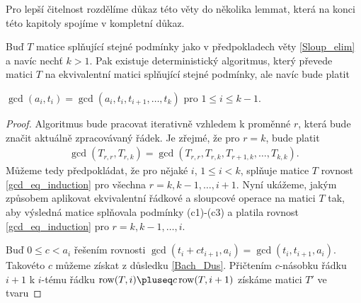 Pro lepší čitelnost rozdělíme důkaz této věty do několika lemmat, která na konci
této kapitoly spojíme v kompletní důkaz.

\begin{lem} \label{Sloup_elim_GCD}
Buď $ T $ matice splňující stejné podmínky jako v předpokladech věty
\ref{Sloup_elim} a navíc nechť $ k > 1 $. Pak existuje deterministický
algoritmus, který převede matici $ T $ na ekvivalentní matici splňující stejné
podmínky, ale navíc bude platit
\begin{Cond}[resume=Sloup_elim_CONDS]
    \item $ \gcd(a_i, t_i) = \gcd(a_i, t_i, t_{i+1},\dots, t_k) $ pro
        $ 1 \leq i \leq k - 1 $.
\end{Cond}
\end{lem}
\begin{proof}
Algoritmus bude pracovat iterativně vzhledem k proměnné $ r $, která bude značit
aktuálně zpracovávaný řádek. Je zřejmé, že pro $ r = k $, bude platit
\begin{align} \label{gcd_eq_induction}
    \gcd(T_{r,r}, T_{r,k}) = \gcd(T_{r,r}, T_{r,k},T_{r+1,k},\dots, T_{k,k}).
\end{align}
Můžeme tedy předpokládat, že pro nějaké $ i $, $ 1 \leq i < k $, splňuje
matice $ T $ rovnost \ref{gcd_eq_induction} pro všechna $ r = k, k-1,\dots, i + 1 $.
Nyní ukážeme, jakým způsobem aplikovat ekvivalentní řádkové a sloupcové operace
na matici $ T $ tak, aby výsledná matice splňovala podmínky (c1)-(c3) a platila
rovnost \ref{gcd_eq_induction} pro $ r = k, k-1,\dots, i $.

Buď $ 0 \leq c < a_i $ řešením rovnosti
$ \gcd(t_i + ct_{i+1}, a_i) = \gcd(t_i, t_{i+1}, a_i) $.
Takovéto $ c $ můžeme získat z důsledku \ref{Bach_Dus}. Přičtením $ c $-násobku
řádku $ i + 1 $ k $ i $-tému řádku $ \operatorname{row}(T, i) \pluseq c \operatorname{row}(T, i + 1) $
získáme matici $ T' $ ve tvaru


\end{proof}
